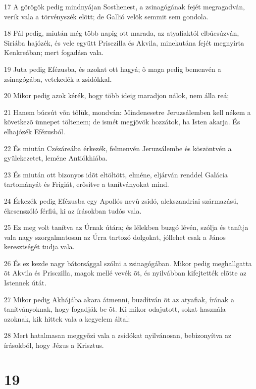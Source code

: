 \par 17 A görögök pedig mindnyájan Sosthenest, a zsinagógának fejét megragadván, verik vala a törvényszék elõtt; de Gallió velök semmit sem gondola.
\par 18 Pál pedig, miután még több napig ott marada, az atyafiaktól elbúcsúzván, Siriába hajózék, és vele együtt Prisczilla és Akvila, minekutána fejét megnyírta Kenkreában; mert fogadása vala.
\par 19 Juta pedig Efézusba, és azokat ott hagyá; õ maga pedig bemenvén a zsinagógába, vetekedék a zsidókkal.
\par 20 Mikor pedig azok kérék, hogy több ideig maradjon nálok, nem álla reá;
\par 21 Hanem búcsút võn tõlük, mondván: Mindenesetre Jeruzsálemben kell nékem a következõ ünnepet töltenem; de ismét megjövök hozzátok, ha Isten akarja. És elhajózék Efézusból.
\par 22 És miután Czézáreába érkezék, felmenvén Jeruzsálembe és köszöntvén a gyülekezetet, leméne Antiókhiába.
\par 23 És miután ott bizonyos idõt eltöltött, elméne, eljárván renddel Galácia tartományát és Frigiát, erõsítve a tanítványokat mind.
\par 24 Érkezék pedig Efézusba egy Apollós nevû zsidó, alekszandriai származású, ékesenszóló férfiú, ki az írásokban tudós vala.
\par 25 Ez meg volt tanítva az Úrnak útára; és lélekben buzgó lévén, szólja és tanítja vala nagy szorgalmatosan az Úrra tartozó dolgokat, jóllehet csak a János keresztségét tudja vala.
\par 26 És ez kezde nagy bátorsággal szólni a zsinagógában. Mikor pedig meghallgatta õt Akvila és Prisczilla, magok mellé vevék õt, és nyilvábban kifejtették elõtte az Istennek útát.
\par 27 Mikor pedig Akhájába akara átmenni, buzdítván õt az atyafiak, írának a tanítványoknak, hogy fogadják be õt. Ki mikor odajutott, sokat használa azoknak, kik hittek vala a kegyelem által:
\par 28 Mert hatalmasan meggyõzi vala a zsidókat nyilvánosan, bebizonyítva az írásokból, hogy Jézus a Krisztus.

\chapter{19}

